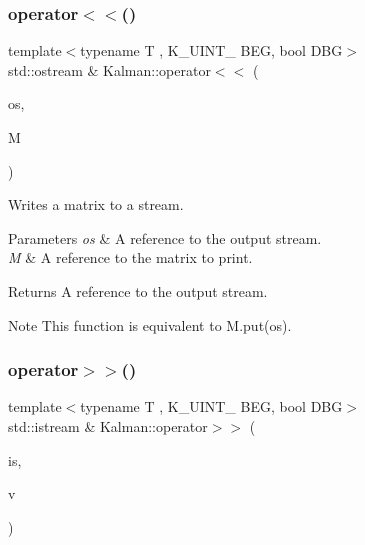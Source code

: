 \subsubsection{\texorpdfstring{operator$<$$<$()}{operator<<()}\hspace{0.1cm}{\footnotesize\ttfamily [2/2]}}
{\footnotesize\ttfamily template$<$typename T , K\+\_\+\+U\+I\+N\+T\+\_ B\+EG, bool D\+BG$>$ \\
std\+::ostream \& Kalman\+::operator$<$$<$ (\begin{DoxyParamCaption}\item[{std\+::ostream \&}]{os,  }\item[{const \mbox{\hyperlink{classKalman_1_1KMatrix}{K\+Matrix}}$<$ T, B\+EG, D\+BG $>$ \&}]{M }\end{DoxyParamCaption})\hspace{0.3cm}{\ttfamily [inline]}}



Writes a matrix to a stream. 


\begin{DoxyParams}{Parameters}
{\em os} & A reference to the output stream. \\
\hline
{\em M} & A reference to the matrix to print. \\
\hline
\end{DoxyParams}
\begin{DoxyReturn}{Returns}
A reference to the output stream. 
\end{DoxyReturn}
\begin{DoxyNote}{Note}
This function is equivalent to {\ttfamily M.\+put(os)}. 
\end{DoxyNote}
\mbox{\label{namespaceKalman_a4bf582c1c296684605647e3e34ff5c82}} 
\subsubsection{\texorpdfstring{operator$>$$>$()}{operator>>()}\hspace{0.1cm}{\footnotesize\ttfamily [1/2]}}
{\footnotesize\ttfamily template$<$typename T , K\+\_\+\+U\+I\+N\+T\+\_ B\+EG, bool D\+BG$>$ \\
std\+::istream \& Kalman\+::operator$>$$>$ (\begin{DoxyParamCaption}\item[{std\+::istream \&}]{is,  }\item[{\mbox{\hyperlink{classKalman_1_1KVector}{K\+Vector}}$<$ T, B\+EG, D\+BG $>$ \&}]{v }\end{DoxyParamCaption})\hspace{0.3cm}{\ttfamily [inline]}}



